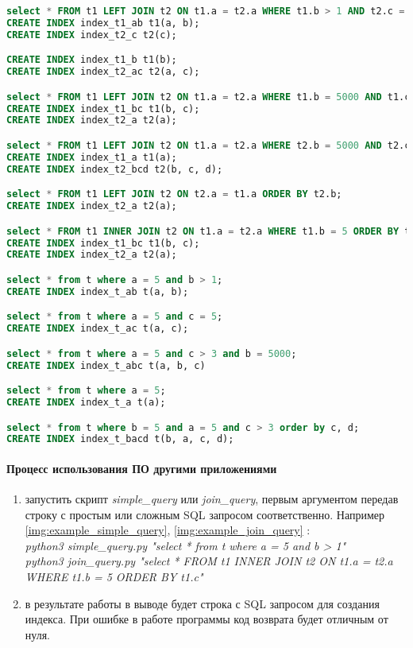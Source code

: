 \begin{lstlisting}[language=sql, caption={Пример выходного файла},label=example-output-file]
select * FROM t1 LEFT JOIN t2 ON t1.a = t2.a WHERE t1.b > 1 AND t2.c = 5;
CREATE INDEX index_t1_ab t1(a, b); 
CREATE INDEX index_t2_c t2(c);

CREATE INDEX index_t1_b t1(b); 
CREATE INDEX index_t2_ac t2(a, c);

select * FROM t1 LEFT JOIN t2 ON t1.a = t2.a WHERE t1.b = 5000 AND t1.c > 3 ORDER BY t2.c , t2.d;
CREATE INDEX index_t1_bc t1(b, c);
CREATE INDEX index_t2_a t2(a);

select * FROM t1 LEFT JOIN t2 ON t1.a = t2.a WHERE t2.b = 5000 AND t2.c > 3 ORDER BY t2.c, t2.d;
CREATE INDEX index_t1_a t1(a);
CREATE INDEX index_t2_bcd t2(b, c, d);

select * FROM t1 LEFT JOIN t2 ON t2.a = t1.a ORDER BY t2.b;
CREATE INDEX index_t2_a t2(a);

select * FROM t1 INNER JOIN t2 ON t1.a = t2.a WHERE t1.b = 5 ORDER BY t1.c;
CREATE INDEX index_t1_bc t1(b, c); 
CREATE INDEX index_t2_a t2(a);

select * from t where a = 5 and b > 1;
CREATE INDEX index_t_ab t(a, b);

select * from t where a = 5 and c = 5;
CREATE INDEX index_t_ac t(a, c);

select * from t where a = 5 and c > 3 and b = 5000;
CREATE INDEX index_t_abc t(a, b, c)

select * from t where a = 5;
CREATE INDEX index_t_a t(a);

select * from t where b = 5 and a = 5 and c > 3 order by c, d;
CREATE INDEX index_t_bacd t(b, a, c, d);
\end{lstlisting}


\paragraph{Процесс использования ПО другими приложениями}

\begin{enumerate}
\item запустить скрипт \textit{simple_query} или \textit{join_query}, первым аргументом передав строку с простым или сложным SQL запросом соответственно. Например \ref{img:example_simple_query}, \ref{img:example_join_query} :\\
\textit{python3 simple_query.py "select * from t where a = 5 and b > 1"} \\
\textit{python3 join_query.py "select * FROM t1 INNER JOIN t2 ON t1.a = t2.a WHERE t1.b = 5 ORDER BY t1.c"}

\item в результате работы в выводе будет строка с SQL запросом для создания индекса. При ошибке в работе программы код возврата будет отличным от нуля.
\end{enumerate}

